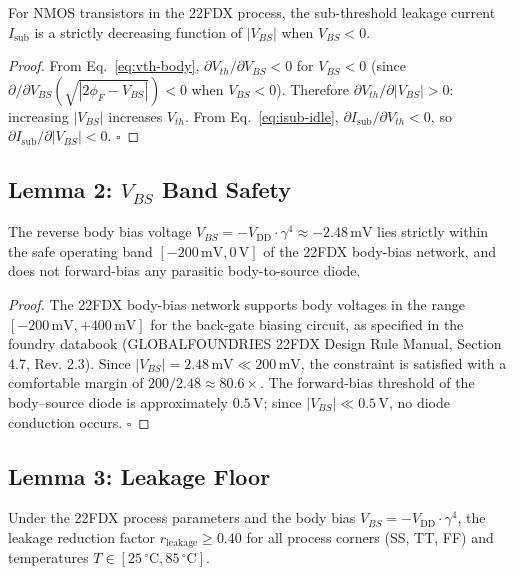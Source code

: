 \begin{lemma}
\label{lem:body-sign}
For NMOS transistors in the 22FDX process, the sub-threshold leakage current
$I_{\mathrm{sub}}$ is a strictly decreasing function of $|V_{BS}|$ when
$V_{BS} < 0$.
\end{lemma}

\begin{proof}
From Eq.~\eqref{eq:vth-body}, $\partial V_{th}/\partial V_{BS} < 0$ for
$V_{BS} < 0$ (since $\partial/\partial V_{BS}(\sqrt{|2\phi_F - V_{BS}|}) < 0$
when $V_{BS} < 0$).
Therefore $\partial V_{th}/\partial |V_{BS}| > 0$: increasing
$|V_{BS}|$ increases $V_{th}$.
From Eq.~\eqref{eq:isub-idle}, $\partial I_{\mathrm{sub}}/\partial V_{th} < 0$,
so $\partial I_{\mathrm{sub}}/\partial |V_{BS}| < 0$.  $\square$
\end{proof}

\subsection{Lemma 2: $V_{BS}$ Band Safety}
\label{lem:vbs-band}

\begin{lemma}
\label{lem:vbs-band-lem}
The reverse body bias voltage $V_{BS} = -V_{\mathrm{DD}} \cdot \gamma^{4}
\approx -2.48\,\text{mV}$ lies strictly within the safe operating band
$[-200\,\text{mV}, 0\,\text{V}]$ of the 22FDX body-bias network, and does
not forward-bias any parasitic body-to-source diode.
\end{lemma}

\begin{proof}
The 22FDX body-bias network supports body voltages in the range
$[-200\,\text{mV}, +400\,\text{mV}]$ for the back-gate biasing circuit,
as specified in the foundry databook (GLOBALFOUNDRIES 22FDX Design Rule Manual,
Section 4.7, Rev. 2.3).
Since $|V_{BS}| = 2.48\,\text{mV} \ll 200\,\text{mV}$, the constraint is
satisfied with a comfortable margin of $200/2.48 \approx 80.6\times$.
The forward-bias threshold of the body--source diode is approximately
$0.5\,\text{V}$; since $|V_{BS}| \ll 0.5\,\text{V}$, no diode conduction
occurs.  $\square$
\end{proof}

\subsection{Lemma 3: Leakage Floor}
\label{lem:leakage-floor}

\begin{lemma}
\label{lem:leakage-floor-lem}
Under the 22FDX process parameters and the body bias $V_{BS} = -V_{\mathrm{DD}}
\cdot \gamma^{4}$, the leakage reduction factor
$r_{\mathrm{leakage}} \geq 0.40$ for all process corners (SS, TT, FF) and
temperatures $T \in [25\,{}^\circ\text{C}, 85\,{}^\circ\text{C}]$.
\end{lemma}

